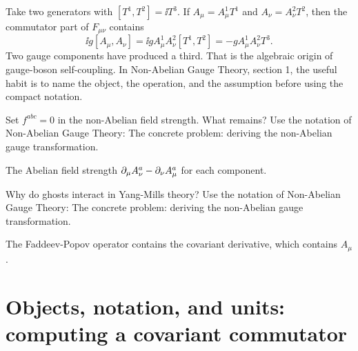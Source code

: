 \begin{example}
Take two generators with \([T^1,T^2]=\ii T^3\).  If \(A_\mu=A_\mu^1T^1\) and \(A_\nu=A_\nu^2T^2\), then the commutator part of \(F_{\mu\nu}\) contains
\[
  \ii g[A_\mu,A_\nu]=\ii gA_\mu^1A_\nu^2[T^1,T^2]=-gA_\mu^1A_\nu^2T^3.
\]
Two gauge components have produced a third.  That is the algebraic origin of gauge-boson self-coupling.  In Non-Abelian Gauge Theory, section 1, the useful habit is to name the object, the operation, and the assumption before using the compact notation.
\end{example}



\begin{exercise}
Set \(f^{abc}=0\) in the non-Abelian field strength.  What remains?  Use the notation of Non-Abelian Gauge Theory: The concrete problem: deriving the non-Abelian gauge transformation.
\begin{answer}
The Abelian field strength \(\partial_\mu A_\nu^a-\partial_\nu A_\mu^a\) for each component.
\end{answer}
\end{exercise}

\begin{exercise}
Why do ghosts interact in Yang-Mills theory?  Use the notation of Non-Abelian Gauge Theory: The concrete problem: deriving the non-Abelian gauge transformation.
\begin{answer}
The Faddeev-Popov operator contains the covariant derivative, which contains \(A_\mu\).
\end{answer}
\end{exercise}



\section{Objects, notation, and units: computing a covariant commutator}













